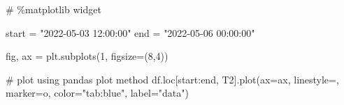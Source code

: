 \documentclass[
  letterpaper,
  DIV=11,
  numbers=noendperiod,
  oneside]{scrreprt}
\newenvironment{Shaded}{\begin{snugshade}}{\end{snugshade}}
\newcommand{\CommentTok}[1]{\textcolor[rgb]{0.37,0.37,0.37}{#1}}
\newcommand{\DecValTok}[1]{\textcolor[rgb]{0.68,0.00,0.00}{#1}}
\newcommand{\NormalTok}[1]{\textcolor[rgb]{0.00,0.23,0.31}{#1}}
\newcommand{\OperatorTok}[1]{\textcolor[rgb]{0.37,0.37,0.37}{#1}}
\newcommand{\StringTok}[1]{\textcolor[rgb]{0.13,0.47,0.30}{#1}}
\begin{document}
\begin{Shaded}
\begin{Highlighting}[]
\CommentTok{\# \%matplotlib widget}

\NormalTok{start }\OperatorTok{=} \StringTok{"2022{-}05{-}03 12:00:00"}
\NormalTok{end }\OperatorTok{=} \StringTok{"2022{-}05{-}06 00:00:00"}

\NormalTok{fig, ax }\OperatorTok{=}\NormalTok{ plt.subplots(}\DecValTok{1}\NormalTok{, figsize}\OperatorTok{=}\NormalTok{(}\DecValTok{8}\NormalTok{,}\DecValTok{4}\NormalTok{))}

\CommentTok{\# plot using pandas\textquotesingle{} plot method}
\NormalTok{df.loc[start:end, }\StringTok{\textquotesingle{}T2\textquotesingle{}}\NormalTok{].plot(ax}\OperatorTok{=}\NormalTok{ax,}
\NormalTok{                             linestyle}\OperatorTok{=}\StringTok{\textquotesingle{}{-}\textquotesingle{}}\NormalTok{,}
\NormalTok{                             marker}\OperatorTok{=}\StringTok{\textquotesingle{}o\textquotesingle{}}\NormalTok{,}
\NormalTok{                             color}\OperatorTok{=}\StringTok{"tab:blue"}\NormalTok{,}
\NormalTok{                             label}\OperatorTok{=}\StringTok{"data"}\NormalTok{)}


\end{Highlighting}
\end{Shaded}
\end{document}
